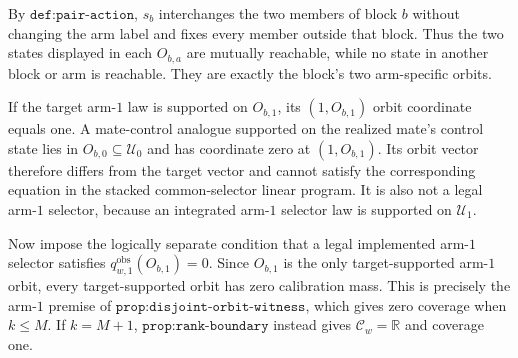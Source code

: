 By \(\texttt{def:pair-action}\), \(s_b\) interchanges the two members of block \(b\) without changing the arm label and fixes every member outside that block. Thus the two states displayed in each \(O_{b,a}\) are mutually reachable, while no state in another block or arm is reachable. They are exactly the block's two arm-specific orbits.

If the target arm-\(1\) law is supported on \(O_{b,1}\), its \((1,O_{b,1})\) orbit coordinate equals one. A mate-control analogue supported on the realized mate's control state lies in \(O_{b,0}\subseteq\mathcal U_0\) and has coordinate zero at \((1,O_{b,1})\). Its orbit vector therefore differs from the target vector and cannot satisfy the corresponding equation in the stacked common-selector linear program. It is also not a legal arm-\(1\) selector, because an integrated arm-\(1\) selector law is supported on \(\mathcal U_1\).

Now impose the logically separate condition that a legal implemented arm-\(1\) selector satisfies \(q^{\mathrm{obs}}_{w,1}(O_{b,1})=0\). Since \(O_{b,1}\) is the only target-supported arm-\(1\) orbit, every target-supported orbit has zero calibration mass. This is precisely the arm-\(1\) premise of \(\texttt{prop:disjoint-orbit-witness}\), which gives zero coverage when \(k\le M\). If \(k=M+1\), \(\texttt{prop:rank-boundary}\) instead gives \(\mathcal C_w=\mathbb R\) and coverage one.